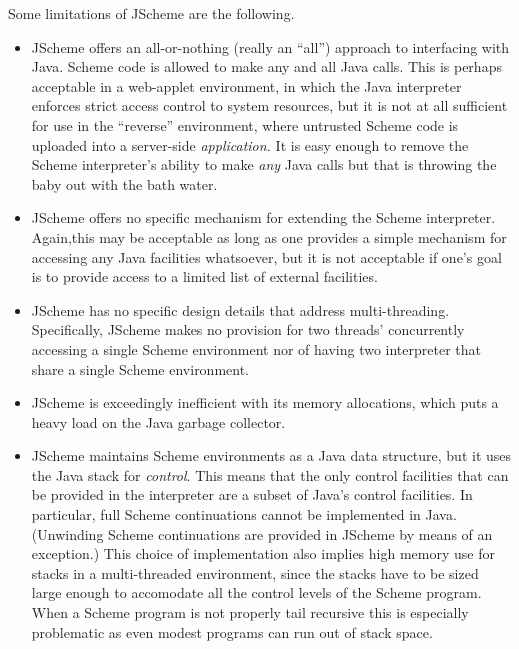 Some limitations of JScheme are the following.
\begin{itemize}
\item JScheme offers an all-or-nothing (really an ``all'') approach to
  interfacing with Java.  Scheme code is allowed to make any and all
  Java calls.  This is perhaps acceptable in a web-applet environment,
  in which the Java interpreter enforces strict access control to
  system resources, but it is not at all sufficient for use in the
  ``reverse'' environment, where untrusted Scheme code is uploaded
  into a server-side {\em application.}  It is easy enough to remove
  the Scheme interpreter's ability to make {\em any\/} Java calls but
  that is throwing the baby out with the bath water.

\item JScheme offers no specific mechanism for extending the Scheme
  interpreter.  Again,this may be acceptable as long as one provides a
  simple mechanism for accessing any Java facilities whatsoever, but
  it is not acceptable if one's goal is to provide access to a limited
  list of external facilities.

\item JScheme has no specific design details that address
  multi-threading.  Specifically, JScheme makes no provision for two
  threads' concurrently accessing a single Scheme environment nor of
  having two interpreter that share a single Scheme environment.

\item JScheme is exceedingly inefficient with its memory allocations,
  which puts a heavy load on the Java garbage collector.

\item JScheme maintains Scheme environments as a Java data structure,
  but it uses the Java stack for {\em control\/}.  This means that the
  only control facilities that can be provided in the interpreter are
  a subset of Java's control facilities.  In particular, full Scheme
  continuations cannot be implemented in Java.  (Unwinding Scheme
  continuations are provided in JScheme by means of an exception.)
  This choice of implementation also implies high memory use for stacks
  in a multi-threaded environment, since the stacks have to be sized
  large enough to accomodate all the control levels of the Scheme program.
  When a Scheme program is not properly tail recursive this is especially
  problematic as even modest programs can run out of stack space.

\end{itemize}

